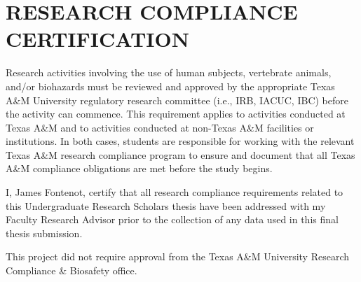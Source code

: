 %



\chapter*{\large\bf RESEARCH COMPLIANCE CERTIFICATION}


\indent\indent Research activities involving the use of human subjects, vertebrate animals, and/or biohazards must be reviewed and approved by the appropriate Texas A\&M  University regulatory research committee (i.e., IRB, IACUC, IBC) before the activity can commence. This requirement applies to activities conducted at Texas A\&M and to activities conducted at non-Texas A\&M facilities or institutions. In both cases, students are responsible for working with the relevant Texas A\&M research compliance program to ensure and document that all Texas A\&M compliance obligations are met before the study begins. %


\indent\indent I, James Fontenot, certify that all research compliance requirements related to this Undergraduate Research Scholars thesis have been addressed with my Faculty Research Advisor prior to the collection of any data used in this final thesis submission.  


\indent\indent This project did not require approval from the Texas A\&M University Research Compliance \& Biosafety office. 
\\

\thispagestyle{empty}

